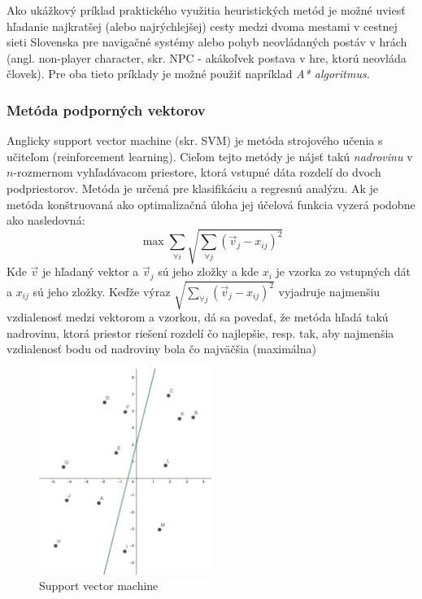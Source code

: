 Ako ukážkový príklad praktického využitia heuristických metód je možné uviesť hľadanie najkratšej (alebo najrýchlejšej)
cesty medzi dvoma mestami v cestnej sieti Slovenska pre navigačné systémy alebo pohyb neovládaných postáv v hrách
(angl. non-player character, skr. NPC - akákoľvek postava v hre, ktorú neovláda človek).
Pre oba tieto príklady je možné použiť napríklad \emph{A* algoritmus}.\cite{heuristic}

\subsubsection{Metóda podporných vektorov}

Anglicky support vector machine (skr. SVM) je metóda strojového učenia s učiteľom (reinforcement
learning).\cite{support_vector_machine}
Cieľom tejto metódy je nájsť takú \emph{nadrovinu} v $n$-rozmernom vyhľadávacom priestore, ktorá vstupné dáta rozdelí
do dvoch podpriestorov.
Metóda je určená pre klasifikáciu a regresnú analýzu.
Ak je metóda konštruovaná ako optimalizačná úloha jej účelová funkcia vyzerá podobne ako nasledovná:
\begin{equation}
    \max \sum_{\forall i}{\sqrt{\sum_{\forall j}{(\vec{v}_j - x_{ij})^2}}}
\end{equation}
Kde $\vec{v}$ je hľadaný vektor a $\vec{v}_j$ sú jeho zložky a kde $x_i$ je vzorka zo vstupných dát a $x_{ij}$ sú jeho
zložky.
Keďže výraz $\sqrt{\sum_{\forall j}{(\vec{v}_j - x_{ij})^2}}$ vyjadruje najmenšiu vzdialenosť medzi vektorom a
vzorkou, dá sa povedať, že metóda hľadá takú nadrovinu, ktorá priestor riešení rozdelí čo najlepšie, resp. tak, aby
najmenšia vzdialenosť bodu od nadroviny bola čo najväčšia (maximálna)
\begin{figure}[H]
    \centering
    \includegraphics[width=0.5\textwidth]{images/svm.png}
    \caption{Support vector machine}
\end{figure}\label{figure:svm}

